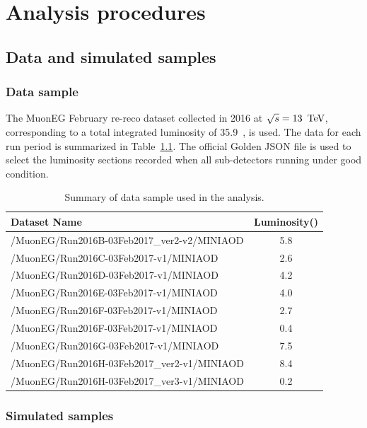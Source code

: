 \chapter{Analysis procedures}  
\label{Chap:Ana}
	\section{Data and simulated samples}
		\subsection{Data sample}
		The MuonEG February re-reco dataset collected in 2016 at $\sqrt{s}=13~\,\text{Te\hspace{-.08em}V}$, corresponding to a total integrated luminosity of 35.9~\fbinv , is used. The data for each run period is summarized in Table~\ref{tab:datasample}. The official Golden JSON file is used to select the luminosity sections recorded when all sub-detectors running under good condition. 
		\begin{table}[!ht]
		  \begin{center}
		    \begin{tabular}{|l|c|}
		      \hline
		      Dataset Name                                & Luminosity(\fbinv)                       \\ \hline
		      /MuonEG/Run2016B-03Feb2017\_ver2-v2/MINIAOD   & 5.8     \\
		      /MuonEG/Run2016C-03Feb2017-v1/MINIAOD   & 2.6     \\
		      /MuonEG/Run2016D-03Feb2017-v1/MINIAOD   & 4.2     \\
		      /MuonEG/Run2016E-03Feb2017-v1/MINIAOD   & 4.0     \\
		      /MuonEG/Run2016F-03Feb2017-v1/MINIAOD   & 2.7     \\
		      /MuonEG/Run2016F-03Feb2017-v1/MINIAOD   & 0.4     \\
		      /MuonEG/Run2016G-03Feb2017-v1/MINIAOD   & 7.5     \\
		      /MuonEG/Run2016H-03Feb2017\_ver2-v1/MINIAOD   & 8.4     \\
		      /MuonEG/Run2016H-03Feb2017\_ver3-v1/MINIAOD   & 0.2      \\
		      \hline
		    \end{tabular}
		    \caption{Summary of data sample used in the analysis.\label{tab:datasample}}
		  \end{center}
		\end{table}
		
		\subsection{Simulated samples}
